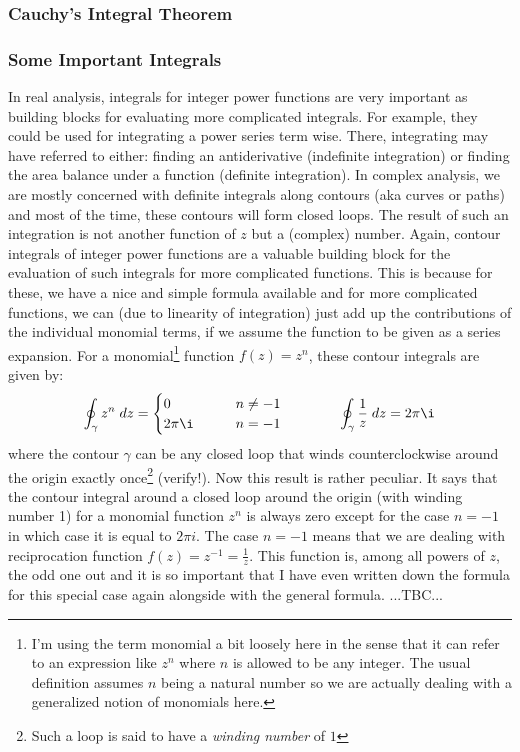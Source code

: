 


\subsubsection{Cauchy's Integral Theorem}




\subsubsection{Some Important Integrals}
In real analysis, integrals for integer power functions are very important as building blocks for evaluating more complicated integrals. For example, they could be used for integrating a power series term wise. There, integrating may have referred to either: finding an antiderivative (indefinite integration) or finding the area balance under a function (definite integration). In complex analysis, we are mostly concerned with definite integrals along contours (aka curves or paths) and most of the time, these contours will form closed loops. The result of such an integration is not another function of $z$ but a (complex) number. Again, contour integrals of integer power functions are a valuable building block for the evaluation of such integrals for more complicated functions. This is because for these, we have a nice and simple formula available and for more complicated functions, we can (due to linearity of integration) just add up the contributions of the individual monomial terms, if we assume the function to be given as a series expansion. For a monomial\footnote{I'm using the term monomial a bit loosely here in the sense that it can refer to an expression like $z^n$ where $n$ is allowed to be any integer. The usual definition assumes $n$ being a natural number so we are actually dealing with a generalized notion of monomials here.} function $f(z) = z^n$, these contour integrals are given by:
\begin{equation}
\oint_{\gamma} z^n \; dz = 
\begin{cases}
0        \qquad & n \neq -1 \\
2 \pi \i \qquad & n = -1
\end{cases}
\qquad \qquad
\oint_{\gamma} \frac{1}{z} \; dz = 2 \pi \i
\end{equation}
where the contour $\gamma$ can be any closed loop that winds counterclockwise around the origin exactly once\footnote{Such a loop is said to have a \emph{winding number} of $1$} (verify!). Now this result is rather peculiar. It says that the contour integral around a closed loop around the origin (with winding number 1) for a monomial function $z^n$ is always zero except for the case $n=-1$ in which case it is equal to $2 \pi i$. The case $n=-1$ means that we are dealing with reciprocation function $f(z) = z^{-1} = \frac{1}{z}$. This function is, among all powers of $z$, the odd one out and it is so important that I have even written down the formula for this special case again alongside with the general formula. ...TBC...

